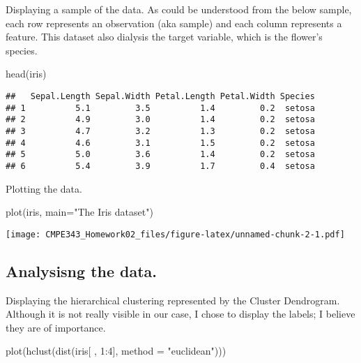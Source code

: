 \documentclass[
]{article}
\newenvironment{Shaded}{\begin{snugshade}}{\end{snugshade}}
\newcommand{\AttributeTok}[1]{\textcolor[rgb]{0.77,0.63,0.00}{#1}}
\newcommand{\DecValTok}[1]{\textcolor[rgb]{0.00,0.00,0.81}{#1}}
\newcommand{\FunctionTok}[1]{\textcolor[rgb]{0.00,0.00,0.00}{#1}}
\newcommand{\NormalTok}[1]{#1}
\newcommand{\SpecialCharTok}[1]{\textcolor[rgb]{0.00,0.00,0.00}{#1}}
\newcommand{\StringTok}[1]{\textcolor[rgb]{0.31,0.60,0.02}{#1}}
\begin{document}
Displaying a sample of the data. As could be understood from the below
sample, each row represents an observation (aka sample) and each column
represents a feature. This dataset also dialysis the target variable,
which is the flower's species.

\begin{Shaded}
\begin{Highlighting}[]
\FunctionTok{head}\NormalTok{(iris)}
\end{Highlighting}
\end{Shaded}

\begin{verbatim}
##   Sepal.Length Sepal.Width Petal.Length Petal.Width Species
## 1          5.1         3.5          1.4         0.2  setosa
## 2          4.9         3.0          1.4         0.2  setosa
## 3          4.7         3.2          1.3         0.2  setosa
## 4          4.6         3.1          1.5         0.2  setosa
## 5          5.0         3.6          1.4         0.2  setosa
## 6          5.4         3.9          1.7         0.4  setosa
\end{verbatim}

Plotting the data.

\begin{Shaded}
\begin{Highlighting}[]
\FunctionTok{plot}\NormalTok{(iris, }\AttributeTok{main=}\StringTok{"The Iris dataset"}\NormalTok{)}
\end{Highlighting}
\end{Shaded}

\texttt{[image: CMPE343\_Homework02\_files/figure-latex/unnamed-chunk-2-1.pdf]}

\hypertarget{analysisng-the-data.}{%
\subsection{Analysisng the data.}\label{analysisng-the-data.}}

Displaying the hierarchical clustering represented by the Cluster
Dendrogram. Although it is not really visible in our case, I chose to
display the labels; I believe they are of importance.

\begin{Shaded}
\begin{Highlighting}[]
\FunctionTok{plot}\NormalTok{(}\FunctionTok{hclust}\NormalTok{(}\FunctionTok{dist}\NormalTok{(iris[ , }\DecValTok{1}\SpecialCharTok{:}\DecValTok{4}\NormalTok{], }\AttributeTok{method =} \StringTok{"euclidean"}\NormalTok{)))}
\end{Highlighting}
\end{Shaded}
\end{document}
